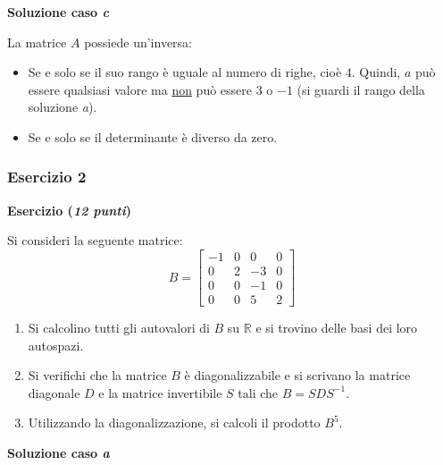 \documentclass[a4paper]{article}
\begin{document}
	\noindent
	\textcolor{Green4}{\textbf{Soluzione caso \emph{c}}}\newline
	
	\noindent
	La matrice $A$ possiede un'inversa:
	\begin{itemize}
		\item Se e solo se il suo rango è uguale al numero di righe, cioè $4$. Quindi, $a$ può essere qualsiasi valore ma \underline{non} può essere $3$ o $-1$ (si guardi il rango della soluzione \emph{a}).
		\item Se e solo se il determinante è diverso da zero.
	\end{itemize}\newpage

	\subsubsection{Esercizio 2}
	
	\textcolor{Red3}{\textbf{Esercizio (\emph{12 punti})}}\newline
	
	\noindent
	Si consideri la seguente matrice:
	\begin{equation*}
		B = \begin{bmatrix}
			-1 & 0 & 0 & 0 	\\
			 0 & 2 & -3 & 0 	\\
			 0 & 0 & -1 & 0 	\\
			 0 & 0 & 5 & 2
		\end{bmatrix}
	\end{equation*}
	\begin{enumerate}[label=(\alph*)]
		\item Si calcolino tutti gli autovalori di $B$ su $\mathbb{R}$ e si trovino delle basi dei loro autospazi.
		
		\item Si verifichi che la matrice $B$ è diagonalizzabile e si scrivano la matrice diagonale $D$ e la matrice invertibile $S$ tali che $B = SDS^{-1}$.
		
		\item Utilizzando la diagonalizzazione, si calcoli il prodotto $B^{5}$.
	\end{enumerate}
	
	\noindent
	\textcolor{Green4}{\textbf{Soluzione caso \emph{a}}}\newline
	
\end{document}

